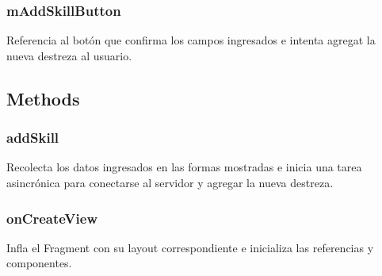 \documentclass[letterpaper,10pt,english]{sphinxmanual}
\begin{document}
\subsubsection{mAddSkillButton}
\label{Fragments/AddSkillFragment:maddskillbutton}

\begin{fulllineitems}
\label{Fragments/AddSkillFragment:com.fiuba.tallerii.jobify.AddSkillFragment.mAddSkillButton}
Referencia al botón que confirma los campos ingresados e intenta agregat la nueva destreza al usuario.

\end{fulllineitems}



\subsection{Methods}
\label{Fragments/AddSkillFragment:methods}

\subsubsection{addSkill}
\label{Fragments/AddSkillFragment:addskill}

\begin{fulllineitems}
\label{Fragments/AddSkillFragment:com.fiuba.tallerii.jobify.AddSkillFragment.addSkill()}
Recolecta los datos ingresados en las formas mostradas e inicia una tarea asincrónica para conectarse al servidor y agregar la nueva destreza.

\end{fulllineitems}



\subsubsection{onCreateView}
\label{Fragments/AddSkillFragment:oncreateview}

\begin{fulllineitems}
\label{Fragments/AddSkillFragment:com.fiuba.tallerii.jobify.AddSkillFragment.onCreateView(LayoutInflater, ViewGroup, Bundle)}
Infla el Fragment con su layout correspondiente e inicializa las referencias y componentes.

\end{fulllineitems}
\end{document}
